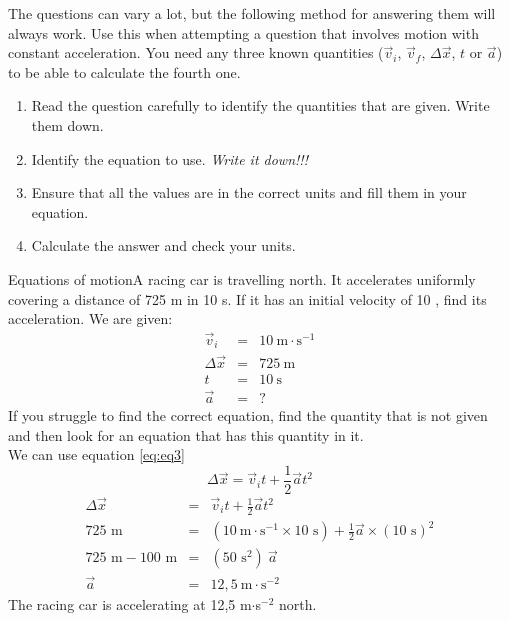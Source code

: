       \label{m38796*id76069}The questions can vary a lot, but the following method for answering them will always work. Use this when attempting a question that involves motion with constant acceleration. You need any three known quantities ($\vec{v}_{i}$, $\vec{v}_{f}$, $\Delta \vec{x}$, $t$ or $\vec{a}$) to be able to calculate the fourth one.\par 
      \label{m38796*id76133}\begin{enumerate}[noitemsep, label=\textbf{\arabic*}. ] 
            \label{m38796*uid130}\item Read the question carefully to identify the quantities that are given. Write them down.
\label{m38796*uid131}\item Identify the equation to use. \textsl{Write it down!!!}\label{m38796*uid132}\item Ensure that all the values are in the correct units and fill them in your equation.
\label{m38796*uid133}\item Calculate the answer and check your units.
\end{enumerate}
\pagebreak
\begin{wex}{Equations of motion}{A racing car is travelling north. It accelerates uniformly  covering a distance of 725 m in 10 s. If it has an initial velocity of 10 \ms, find its acceleration.}
{ We are given:
\begin{eqnarray*}
\vec{v}_i&=&10\ \text{m} \cdot \text{s}^{-1}\\
\Delta \vec{x}&=&725\ \text{m}\\
t&=&10\ \text{s}\\
\vec{a}&=&?
\end{eqnarray*}
If you struggle to find the correct equation, find the quantity that is not given and then look for an equation that has this quantity in it.\\
We can use equation \ref{eq:eq3}
\begin{displaymath}
\Delta \vec{x}=\vec{v}_it +\frac{1}{2}\vec{a}t^2
\end{displaymath}
\begin{eqnarray*}
\Delta \vec{x} &=& \vec{v}_it +\frac{1}{2}\vec{a}t^2\\
725\text{~m} &=& (10~\text{m}\cdot \text{s}^{-1} \times 10\text{~s}) + \frac{1}{2} \vec{a} \times (10\text{~s})^2\\
725\text{~m} - 100\text{~m} &=& (50\text{~s}^2)~ \vec{a}\\
\vec{a} &=& 12,5~ \text{m} \cdot\text{s}^{-2}
\end{eqnarray*}
The racing car is accelerating at 12,5 m$\cdot$s$^{-2}$ north.}
\end{wex}
